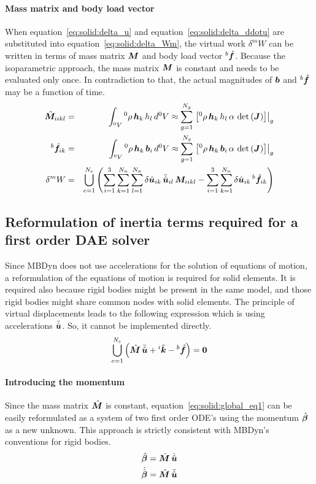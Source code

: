 \paragraph{Mass matrix and body load vector}
When equation~\ref{eq:solid:delta_u} and equation~\ref{eq:solid:delta_ddotu} are substituted into equation~\ref{eq:solid:delta_Wm},
the virtual work $\delta^mW$ can be written in terms of mass matrix $\bm{M}$ and body load vector $^b\hat{\bm{f}}$.
Because the isoparametric approach, the mass matrix $\bm{M}$ is constant and needs to be evaluated only once.
In contradiction to that, the actual magnitudes of $\bm{b}$ and $^b\hat{\bm{f}}$ may be a function of time.
\begin{eqnarray}
\hat{\bm{M}}_{iikl} & = & \int_{^0V} {^0}\rho \, \bm{h}_k \, h_l \, d^0V \approx \sum_{g=1}^{N_g} \left.\left[{^0}\rho \, \bm{h}_k \, h_l \, \alpha \, \det{\left(\bm{J}\right)}\right]\right\vert_{g} \\
{^b}\hat{\bm{f}}_{ik} & = & \int_{^0V} {^0}\rho \, \bm{h}_k \, \bm{b}_i \, d^0V \approx \sum_{g=1}^{N_g} \left.\left[{^0}\rho \, \bm{h}_k \, \bm{b}_i \, \alpha \, \det{\left(\bm{J}\right)}\right]\right\vert_{g} \\
\delta^{m}W & = & \bigcup_{e=1}^{N_e}\left(\sum_{i=1}^3\sum_{k=1}^{N_n}\sum_{l=1}^{N_n} \delta\hat{\bm{u}}_{ik} \, \ddot{\hat{\bm{u}}}_{il} \, \bm{M}_{iikl}
 - \sum_{i=1}^3\sum_{k=1}^{N_n} \delta\hat{\bm{u}}_{ik} \, {^b}\hat{\bm{f}}_{ik}\right)
\end{eqnarray}

\subsection{Reformulation of inertia terms required for a first order DAE solver}
Since MBDyn does not use accelerations for the solution of equations of motion, a reformulation of the equations of motion is required for solid elements.
It is required also because rigid bodies might be present in the same model, and those rigid bodies might share common nodes with solid elements.
The principle of virtual displacements leads to the following expression which is using accelerations $\ddot{\hat{\bm{u}}}$.
So, it cannot be implemented directly.
\begin{eqnarray}
\bigcup_{e=1}^{N_e} \left(\hat{\bm{M}} \, \ddot{\hat{\bm{u}}} + {^i}\hat{\bm{k}} - {^b}\hat{\bm{f}}\right) = \bm{0} \label{eq:solid:global_eq1}
\end{eqnarray}

\paragraph{Introducing the momentum}
Since the mass matrix $\hat{\bm{M}}$ is constant,
equation~\ref{eq:solid:global_eq1} can be easily reformulated as a system of two first order ODE's
using the momentum $\hat{\bm{\beta}}$ as a new unknown.
This approach is strictly consistent with MBDyn's conventions for rigid bodies.
\begin{eqnarray}
\hat{\bm{\beta}}=\hat{\bm{M}}\,\dot{\hat{\bm{u}}} \label{eq:solid:beta} \\
\dot{\hat{\bm{\beta}}}=\hat{\bm{M}}\,\ddot{\hat{\bm{u}}} \label{eq:solid:betadot}
\end{eqnarray}

